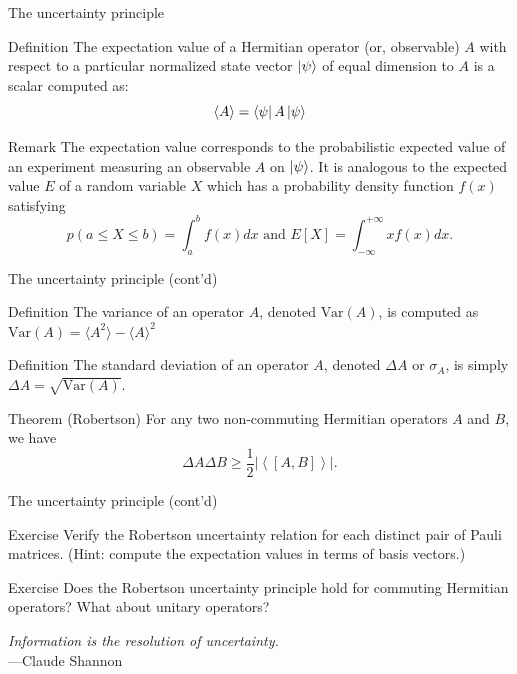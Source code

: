 \documentclass{beamer}
\newcommand{\Var}{\text{Var}}
\begin{document}
\begin{frame}{The uncertainty principle}
    \begin{block}{Definition}
        The expectation value of a Hermitian operator (or, observable) $A$ with respect to a particular normalized state vector $\ket\psi$ of equal dimension to $A$ is a scalar computed as: $$ \langle A \rangle = \bra\psi A \ket\psi $$
    \end{block}
    \begin{block}{Remark}
        The expectation value corresponds to the probabilistic expected value of an experiment measuring an observable $A$ on $\ket\psi$.
        It is analogous to the expected value $E$ of a random variable $X$ which has a probability density function $f(x)$ satisfying
        $$ p(a \leq X \leq b) = \int_a^b f(x)dx \text{ and } E[X]= \int_{-\infty}^{+\infty} xf(x)dx. $$
    \end{block}
\end{frame}


\begin{frame}{The uncertainty principle (cont'd)}
    \begin{block}{Definition}
        The variance of an operator $A$, denoted $\Var(A)$, is computed as $\Var(A) = \langle A^2 \rangle - \langle A \rangle ^2$
    \end{block}
    \begin{block}{Definition}
        The standard deviation of an operator $A$, denoted $\Delta A$ or $\sigma_A$, is simply $\Delta A=\sqrt{\Var (A)}$.
    \end{block}
    \begin{block}{Theorem (Robertson)}
        For any two non-commuting Hermitian operators $A$ and $B$, we have
        $$ \Delta A \Delta B \geq \frac{1}{2} \left | \left\langle \left [A, B \right ] \right\rangle \right |. $$
    \end{block}
\end{frame}

\begin{frame}{The uncertainty principle (cont'd)}
    \begin{block}{Exercise}
        Verify the Robertson uncertainty relation for each distinct pair of Pauli matrices. (Hint: compute the expectation values in terms of basis vectors.)
    \end{block}
    \begin{block}{Exercise}
    	Does the Robertson uncertainty principle hold for commuting Hermitian operators? What about unitary operators?
    \end{block}
    \begin{flushright}
        \textit{Information is the resolution of uncertainty.}\\---Claude Shannon
    \end{flushright}
\end{frame}
\end{document}
